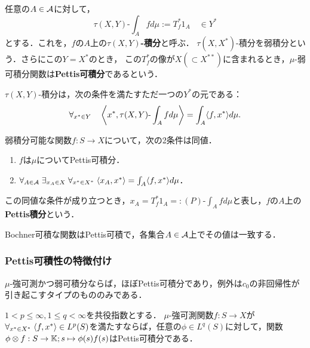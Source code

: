 \documentclass[uplatex,dvipdfmx]{jsreport}
\begin{document}
\begin{definition}
    任意の$A\in\mathcal{A}$に対して，
    \[\tau(X,Y)\text{-}\int_Afd\mu:=T_f^*1_A\quad\in Y^*\]
    とする．これを，$f$の$A$上の\textbf{$\tau(X,Y)$-積分}と呼ぶ．
    $\tau(X,X^*)$-積分を弱積分という．さらにこの$Y=X^*$のとき，
    この$T_f^*$の像が$X(\subset X^{**})$に含まれるとき，$\mu$-弱可積分関数は\textbf{Pettis可積分}であるという．
\end{definition}

\begin{lemma}[弱積分の特徴付け]
    $\tau(X,Y)$-積分は，次の条件を満たすただ一つの$Y^*$の元である：
    \[\forall_{x^*\in Y}\quad\left\langle x^*,\tau(X,Y)\text{-}\int_Afd\mu\right\rangle=\int_A\langle f,x^*\rangle d\mu.\]
\end{lemma}

\begin{proposition}
    弱積分可能な関数$f:S\to X$について，次の2条件は同値．
    \begin{enumerate}
        \item $f$は$\mu$についてPettis可積分．
        \item $\forall_{A\in\mathcal{A}}\;\exists_{x_A\in X}\;\forall_{x^*\in X^*}\;\langle x_A,x^*\rangle=\int_A\langle f,x^*\rangle d\mu$．
    \end{enumerate}
    この同値な条件が成り立つとき，$x_A=T^*_f1_A=:(P)\text{-}\int_Afd\mu$と表し，$f$の$A$上の\textbf{Pettis積分}という．
\end{proposition}
\begin{remarks}
    Bochner可積な関数はPettis可積で，各集合$A\in\mathcal{A}$上でその値は一致する．
\end{remarks}

\subsubsection{Pettis可積性の特徴付け}

\begin{tcolorbox}[colframe=ForestGreen, colback=ForestGreen!10!white,breakable,colbacktitle=ForestGreen!40!white,coltitle=black,fonttitle=\bfseries\sffamily,
title=]
    $\mu$-強可測かつ弱可積分ならば，ほぼPettis可積分であり，例外は$c_0$の非回帰性が引き起こすタイプのもののみである．
\end{tcolorbox}

\begin{theorem}[Pettis可積性の十分条件]
    $1<p\le\infty,1\le q<\infty$を共役指数とする．
    $\mu$-強可測関数$f:S\to X$が$\forall_{x^*\in X^*}\;\langle f,x^*\rangle\in L^p(S)$を満たすならば，任意の$\phi\in L^q(S)$に対して，関数$\phi\otimes f:S\to\mathbb{K};s\mapsto \phi(s)f(s)$はPettis可積分である．
\end{theorem}
\end{document}
